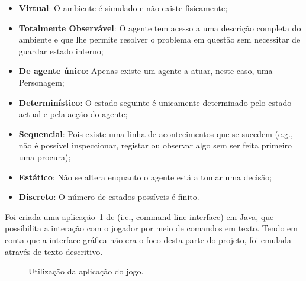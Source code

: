 \begin{itemize}
    \item \textbf{Virtual}: O ambiente é simulado e não existe fisicamente;
    \item \textbf{Totalmente Observável}: O agente tem acesso a uma descrição completa do ambiente e que lhe permite resolver o problema em questão sem necessitar de guardar estado interno;
    \item \textbf{De agente único}: Apenas existe um agente a atuar, neste caso, uma Personagem;
    \item \textbf{Determinístico}: O estado seguinte é unicamente determinado pelo estado actual e pela acção do agente;
    \item \textbf{Sequencial}: Pois existe uma linha de acontecimentos que se sucedem (e.g., não é possível inspeccionar, registar ou observar algo sem ser feita primeiro uma procura);
    \item \textbf{Estático}: Não se altera enquanto o agente está a tomar uma decisão;
    \item \textbf{Discreto}: O número de estados possíveis é finito.
\end{itemize}

Foi criada uma aplicação~\ref{fig:projeto-parte1-jogo} de  (i.e., command-line interface) em Java, que possibilita a interação com o jogador por meio de comandos em texto.
Tendo em conta que a interface gráfica não era o foco desta parte do projeto, foi emulada através de texto descritivo.

\begin{figure}[H]
    \begin{center}
    \end{center}
    \caption{Utilização da aplicação do jogo.}\label{fig:projeto-parte1-jogo}
\end{figure}

